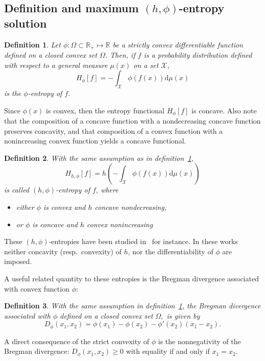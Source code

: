 \documentclass[english,onecolumn]{elsarticle}
\def\dmu{\mathrm{d}\mu}
\def\Rset{\mathbb{R}}
\def\X{\mathcal{X}}
\newtheorem{definition}{Definition}
\begin{document}

\subsection{Definition and maximum $(h,\phi)$-entropy solution}
\label{subsec:DefinitionPhiEnt}

\begin{definition}
  Let  $\phi:  \Omega  \subset  \Rset_+  \mapsto  \Rset$  be  a  strictly  convex
  differentiable function defined on a closed convex set $\Omega$.  Then, if $f$
  is  a probability  distribution  defined  with respect  to  a general  measure
  $\mu(x)$ on a set $\X$,
%
\begin{equation}
H_\phi[f] = - \int_\X \phi(f(x)) \dmu(x)
\label{eq:phi-entropy}
\end{equation}
%
is the $\phi$-entropy of $f$.
\label{def:phi_entropy}
\end{definition}
%
Since $\phi(x)$ is convex, then the entropy functional $H_\phi[f]$ is concave.
Also  note that  the composition  of a  concave function  with a  nondecreasing
concave function preserves concavity, and  that composition of a convex function
with a nonincreasing convex function yields a concave functional.

\begin{definition}%
%
With the same assumption as in definition~\ref{def:phi_entropy},
%
\begin{equation}
H_{h,\phi}[f] = h\left( - \int_\X \phi(f(x)) \dmu(x) \right)
\label{eq:h-phi-entropy}
\end{equation}
%
is called $(h,\phi)$-entropy of $f$, where
%
\begin{itemize}
\item either $\phi$ is convex  and $h$ concave  nondecreasing,
\item or $\phi$ is concave and $h$ convex nonincreasing
\end{itemize}
\end{definition}
%
These  $(h,\phi)$-entropies  have   been  studied  in~\cite{Sal93,MenMor97}  for
instance. In  these works neither concavity  (resp.\ convexity) of  $h$, nor the
differentiability of $\phi$ are imposed.

A  useful  related  quantity  to  these  entropies  is  the  Bregman  divergence
associated with convex function $\phi$:
%
\begin{definition}
  With  the  same assumption  in  definition~\ref{def:phi_entropy}, the  Bregman
  divergence associated with $\phi$ defined  on a closed convex set $\Omega,$ is
  given by
  \begin{equation}
    D_\phi(x_1,x_2) = \phi(x_1) - \phi(x_2) - \phi'(x_2) \left(x_1-x_2\right).
  \end{equation}
  \label{def:Bregman}
\end{definition}
%
A direct consequence  of the strict convexity of $\phi$  is the nonnegativity of
the Bregman  divergence: $D_\phi(x_1,x_2)  \ge 0$ with  equality if and  only if
$x_1 = x_2$.
\end{document}
